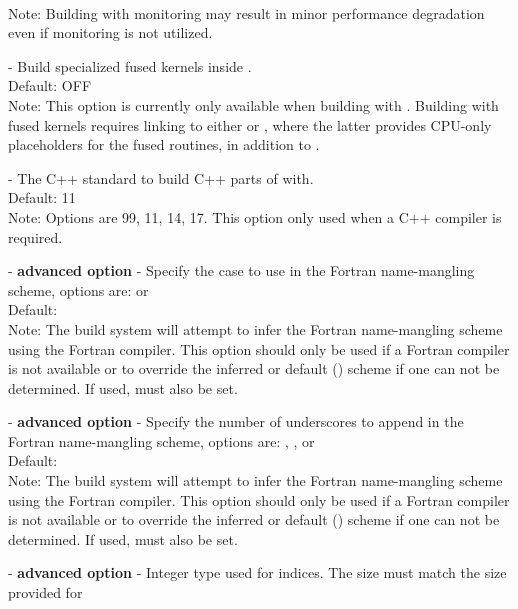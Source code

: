 \begin{description}
  \\
  Note: Building with monitoring may result in minor performance degradation
  even if monitoring is not utilized.
\item[\id{SUNDIALS\_BUILD\_PACKAGE\_FUSED\_KERNELS}] -
  Build specialized fused kernels inside {\cvode}.
  \\
  Default: OFF
  \\
  Note: This option is currently only available when building with
  . Building with fused kernels requires
  linking to either  or
  , where the latter
  provides CPU-only placeholders for the fused routines, in
  addition to .
\item[\id{CMAKE\_CXX\_STANDARD}] -
  The C++ standard to build C++ parts of {\sundials} with.
  \\
  Default: 11
  \\
  Note: Options are 99, 11, 14, 17. This option only used when a
  C++ compiler is required.
\item[\id{SUNDIALS\_F77\_FUNC\_CASE}] - \textbf{advanced option} -
  Specify the case to use in the Fortran name-mangling scheme, options
  are:  or 
  \\
  Default:
  \\
  Note: The build system will attempt to infer the Fortran
  name-mangling scheme using the Fortran compiler. This option should
  only be used if a Fortran compiler is not available or to override
  the inferred or default () scheme if one can not be
  determined. If used,  must also
  be set.
\item[\id{SUNDIALS\_F77\_FUNC\_UNDERSCORES}] - \textbf{advanced option} -
  Specify the number of underscores to append in the Fortran
  name-mangling scheme, options are: , , or 
  \\
  Default:
  \\
  Note: The build system will attempt to infer the Fortran
  name-mangling scheme using the Fortran compiler. This option should
  only be used if a Fortran compiler is not available or to override
  the inferred or default () scheme if one can not be
  determined. If used,  must also be set.
\item[\id{SUNDIALS\_INDEX\_TYPE}] - \textbf{advanced option} -
  Integer type used for {\sundials} indices. The size must match the size provided for

\end{description}
